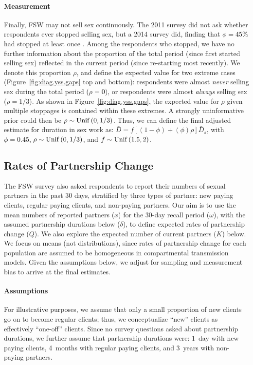 \paragraph{Measurement}
Finally, FSW may not sell sex continuously.
The 2011 survey did not ask whether respondents ever stopped selling sex,
but a 2014 survey did, finding that $\phi = 45\%$ had stopped at least once \cite{EswKP2014}.
Among the respondents who stopped, we have no further information about
the proportion of the total period (\ie since first started selling sex)
reflected in the current period (\ie since re-starting most recently).
We denote this proportion $\rho$, and define the expected value for two extreme cases
(Figure~\ref{fig:diag.yss.gaps} top and bottom):
respondents were almost \emph{never} selling sex during the total period ($\rho = 0$), or
respondents were almost \emph{always} selling sex ($\rho = 1/3$).
As shown in Figure~\ref{fig:diag.yss.gaps},
the expected value for $\rho$ given multiple stoppages is contained within these extremes.
A strongly uninformative prior could then be $\rho \sim \mathrm{Unif}\,(0,1/3)$.
Thus, we can define the final adjusted estimate for duration in sex work as:
$\bar{D} = f[(1-\phi)+(\phi)\rho]\bar{D}_s$, with
$\phi = 0.45$, $\rho \sim \mathrm{Unif}\,(0,1/3)$, and $f \sim \mathrm{Unif}\,(1.5,2)$.
\subsection{Rates of Partnership Change}\label{meth.partners}
The FSW survey \cite{Baral2014} also asked respondents to report
their numbers of sexual partners in the past 30 days,
stratified by three types of partner:
new paying clients, regular paying clients, and non-paying partners.
Our aim is to use the mean numbers of reported partners ($x$)
for the 30-day recall period ($\omega$),
with the assumed partnership durations below ($\delta$),
to define expected rates of partnership change ($Q$).
We also explore the expected number of current partners ($K$) below.
We focus on means (not distributions), since
rates of partnership change for each population are assumed to be
homogeneous in compartmental transmission models.
Given the assumptions below, we adjust for sampling and measurement bias
to arrive at the final estimates.
\paragraph{Assumptions}
For illustrative purposes, we assume that
only a small proportion of new clients go on to become regular clients;
thus, we conceptualize ``new'' clients as effectively ``one-off'' clients.
Since no survey questions asked about partnership durations,
we further assume that partnership durations were:
1~day with new paying clients,
4~months with regular paying clients, and
3~years with non-paying partners.

